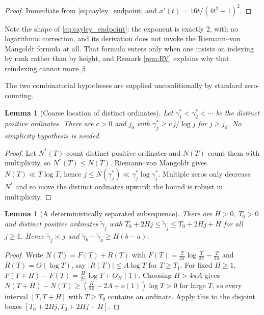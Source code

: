 \documentclass[11pt]{amsart}
\numberwithin{equation}{section}
\theoremstyle{plain}
\newtheorem{lemma}[theorem]{Lemma}
\theoremstyle{definition}
\theoremstyle{remark}
\begin{document}
\begin{proof}
Immediate from \eqref{eq:cayley_endpoint} and $x'(t)=16t/(4t^{2}+1)^{2}$.
\end{proof}

Note the shape of \eqref{eq:cayley_endpoint}: the exponent is exactly $2$, with no logarithmic
correction, and its derivation does not invoke the Riemann--von Mangoldt formula at all. That
formula enters only when one insists on indexing by rank rather than by height, and Remark
\ref{rem:RV} explains why that reindexing cannot move $\beta$.

The two combinatorial hypotheses are supplied unconditionally by standard zero-counting.

\begin{lemma}[Coarse location of distinct ordinates]
\label{lem:coarse}
Let $\gamma_{1}^{*}<\gamma_{2}^{*}<\cdots$ be the distinct positive ordinates. There are $c>0$ and
$j_{0}$ with $\gamma_{j}^{*}\ge c\,j/\log j$ for $j\ge j_{0}$. No simplicity hypothesis is needed.
\end{lemma}

\begin{proof}
Let $N^{*}(T)$ count distinct positive ordinates and $N(T)$ count them with multiplicity, so
$N^{*}(T)\le N(T)$. Riemann--von Mangoldt gives $N(T)\ll T\log T$, hence
$j\le N(\gamma_{j}^{*})\ll\gamma_{j}^{*}\log\gamma_{j}^{*}$. Multiple zeros only decrease $N^{*}$
and so move the distinct ordinates upward; the bound is robust in multiplicity.
\end{proof}

\begin{lemma}[A deterministically separated subsequence]
\label{lem:separated}
There are $H>0$, $T_{0}>0$ and distinct positive ordinates $\widetilde\gamma_{j}$ with
$T_{0}+2Hj\le\widetilde\gamma_{j}\le T_{0}+2Hj+H$ for all $j\ge1$. Hence
$\widetilde\gamma_{j}\asymp j$ and $\widetilde\gamma_{b}-\widetilde\gamma_{a}\ge H(b-a)$.
\end{lemma}

\begin{proof}
Write $N(T)=F(T)+R(T)$ with $F(T)=\frac T{2\pi}\log\frac T{2\pi}-\frac T{2\pi}$ and
$R(T)=O(\log T)$, say $|R(T)|\le A\log T$ for $T\ge T_{1}$. For fixed $H\ge1$,
$F(T+H)-F(T)=\frac H{2\pi}\log T+O_{H}(1)$. Choosing $H>4\pi A$ gives
$N(T+H)-N(T)\ge(\frac H{2\pi}-2A+o(1))\log T>0$ for large $T$, so every interval $[T,T+H]$ with
$T\ge T_{0}$ contains an ordinate. Apply this to the disjoint boxes $[T_{0}+2Hj,T_{0}+2Hj+H]$.
\end{proof}
\end{document}

